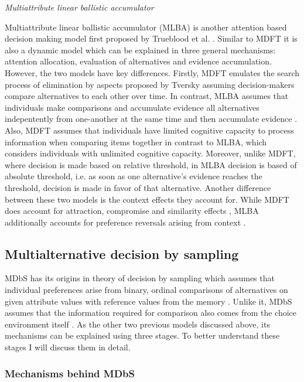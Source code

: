 \documentclass[a4paper,12pt]{article}
\newcommand{\citeyearonly}[1]{\citeyearpar{#1}}
\begin{document}
\textit{Multiattribute linear ballistic accumulator}

Multiattribute linear ballistic accumulator (MLBA) is another attention based decision making model first proposed by Trueblood et al. \citeyearonly{trueblood2014multiattribute}. Similar to MDFT it is also a dynamic model which can be explained in three general mechanisms: attention allocation, evaluation of alternatives and evidence accumulation. However, the two models have key differences. Firstly, MDFT emulates the search process of elimination by aspects proposed by Tversky \citeyearonly{tversky1972elimination} assuming decision-makers compare alternatives to each other over time. In contrast, MLBA assumes that individuals make comparisons and accumulate evidence all alternatives indepentently from one-another at the same time and then accumulate evidence \citep{trueblood15fragile}. Also, MDFT assumes that individuals have limited cognitive capacity to process information when comparing items together in contrast to MLBA, which considers individuals with unlimited cognitive capacity. Moreover, unlike MDFT, where decision is made based on relative threshold, in MLBA decision is based of absolute threshold, i.e. as soon as one alternative's evidence reaches the threshold, decision is made in favor of that alternative. Another difference between these two models is the context effects they account for. While MDFT does account for attraction, compromise and similarity effects \citep{hotaling2019quantitative}, MLBA additionally accounts for preference reversals arising from context \citep{trueblood15fragile}. 


\subsection{Multialternative decision by sampling}

MDbS has its origins in theory of decision by sampling which assumes that individual preferences arise from binary, ordinal comparisons of alternatives on given attribute values with reference values from the memory \citep{stewart2006decision}. Unlike it, MDbS assumes that the information required for comparison also comes from the choice environment itself \citep{noguchi2018multialternative}. As the other two previous models discussed above, its mechanisms can be explained using three stages. To better understand these stages I will discuss them in detail.

\subsubsection{Mechanisms behind MDbS} \label{subsec:mechanismMDBS}
\end{document}
